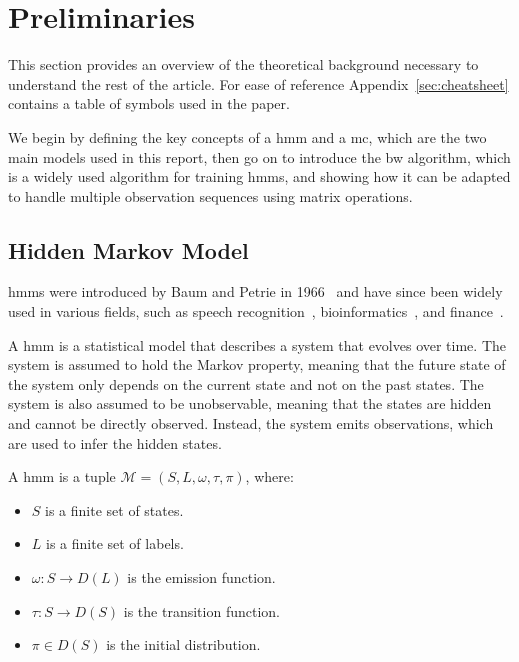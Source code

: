 \section{Preliminaries}\label{sec:preliminaries}
This section provides an overview of the theoretical background necessary to understand the rest of the article.
For ease of reference Appendix~\ref{sec:cheatsheet} contains a table of symbols used in the paper.

We begin by defining the key concepts of a \gls{hmm} and a \gls{mc}, which are the two main models used in this report, then go on to introduce the \gls{bw} algorithm, which is a widely used algorithm for training \glspl{hmm}, and showing how it can be adapted to handle multiple observation sequences using matrix operations.

\subsection{Hidden Markov Model}\label{subsec:hmm}
\glspl{hmm} were introduced by Baum and Petrie in 1966~\cite{baum1966statistical} and have since been widely used in various fields, such as speech recognition~\cite{chavan2013overview}, bioinformatics~\cite{ciocchetta2009bio}, and finance~\cite{mamon2007hidden}.

A \gls{hmm} is a statistical model that describes a system that evolves over time.
The system is assumed to hold the Markov property, meaning that the future state of the system only depends on the current state and not on the past states.
The system is also assumed to be unobservable, meaning that the states are hidden and cannot be directly observed.
Instead, the system emits observations, which are used to infer the hidden states.


\begin{definition}
    A \gls{hmm} is a tuple $\mathcal{M} = (S, L, \omega, \tau, \pi)$, where:
    \begin{itemize}
        \item $S$ is a finite set of states.
        \item $L$ is a finite set of labels.
        \item $\omega: S \rightarrow D(L)$ is the emission function.
        \item $\tau: S \rightarrow D(S)$ is the transition function.
        \item $\pi \in D(S)$ is the initial distribution.
    \end{itemize}
\end{definition}


